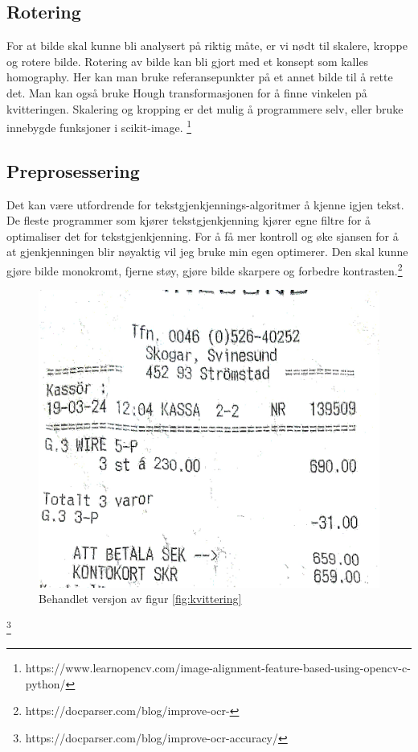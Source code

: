 \documentclass{article}
\begin{document}
\subsection{Rotering}
For at bilde skal kunne bli analysert på riktig måte, er vi nødt til skalere, kroppe og rotere bilde. Rotering av bilde kan bli gjort med et konsept som kalles homography. Her kan man bruke referansepunkter på et annet bilde til å rette det. Man kan også bruke Hough transformasjonen for å finne vinkelen på kvitteringen. Skalering og kropping er det mulig å programmere selv, eller bruke innebygde funksjoner i scikit-image. \footnote{https://www.learnopencv.com/image-alignment-feature-based-using-opencv-c-python/}
\subsection{Preprosessering}
Det kan være utfordrende for tekstgjenkjennings-algoritmer å kjenne igjen tekst. De fleste programmer som kjører tekstgjenkjenning kjører egne filtre for å optimaliser det for tekstgjenkjenning. For å få mer kontroll og øke sjansen for å at gjenkjenningen blir nøyaktig vil jeg bruke min egen optimerer. Den skal kunne gjøre bilde monokromt, fjerne støy, gjøre bilde skarpere og forbedre kontrasten.\footnote{https://docparser.com/blog/improve-ocr-}
\begin{figure}[h!]
\centering
\includegraphics[scale=0.2]{images/test_image_threated.jpg}
\caption{Behandlet versjon av figur \ref{fig:kvittering}}
\label{fig:behandlet_kvittering}
\end{figure}
\footnote{https://docparser.com/blog/improve-ocr-accuracy/}
\end{document}
